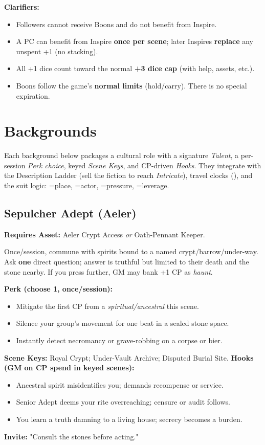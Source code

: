 \textbf{Clarifiers:}
\begin{itemize}
  \item Followers cannot receive Boons and do not benefit from Inspire.
  \item A PC can benefit from Inspire \textbf{once per scene}; later Inspires \textbf{replace} any unspent +1 (no stacking).
  \item All +1 dice count toward the normal \textbf{+3 dice cap} (with help, assets, etc.).
  \item Boons follow the game's \textbf{normal limits} (hold/carry). There is no special expiration.
\end{itemize}

\section{Backgrounds}
Each background below packages a cultural role with a signature \emph{Talent}, a per-session \emph{Perk choice}, keyed \emph{Scene Keys}, and CP-driven \emph{Hooks}. They integrate with the Description Ladder (sell the fiction to reach \emph{Intricate}), travel clocks (\ClockSizes), and the suit logic: \SuitSpade{}=place, \SuitHeart{}=actor, \SuitClub{}=pressure, \SuitDiamond{}=leverage.

\subsection{Sepulcher Adept (Aeler)}
\textbf{Requires Asset:} Aeler Crypt Access \emph{or} Oath-Pennant Keeper.
\begin{tcolorbox}[enhanced,sharp corners,boxrule=.6pt,title={Talent — Whisper of the Unquiet Dead (6 XP)}]
Once/session, commune with spirits bound to a named crypt/barrow/under-way. Ask \textbf{one} direct question; answer is truthful but limited to their death and the stone nearby. If you press further, GM may bank +1 CP as \emph{haunt}.
\end{tcolorbox}
\textbf{Perk (choose 1, once/session):}
\begin{itemize}
  \item Mitigate the first CP from a \emph{spiritual/ancestral} \SuitClub{} this scene.
  \item Silence your group's movement for one beat in a sealed stone space.
  \item Instantly detect necromancy or grave-robbing on a corpse or bier.
\end{itemize}
\textbf{Scene Keys:} Royal Crypt; Under-Vault Archive; Disputed Burial Site.
\textbf{Hooks (GM on CP spend in keyed scenes):}
\begin{itemize}
  \item Ancestral spirit misidentifies you; demands recompense or service.
  \item Senior Adept deems your rite overreaching; censure or audit follows.
  \item You learn a truth damning to a living house; secrecy becomes a burden.
\end{itemize}
\textbf{Invite:} "Consult the stones before acting."


